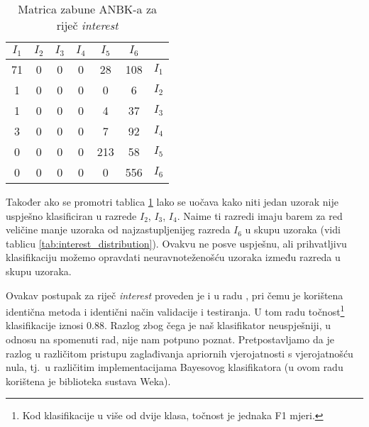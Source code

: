 \documentclass[10pt, a4paper]{article}
\begin{document}
\begin{table}[!hbtp]
\caption{Matrica zabune ANBK-a za riječ \emph{interest}}
\label{tab:interest_confusion_bayes}
\begin{center}
\begin{tabular}{|cccccc|c|}
\hline
$I_1$ & $I_2$ & $I_3$ & $I_4$ & $I_5$ & $I_6$ &  \\
\hline
  71  & 0 &  0 &  0 & 28  & 108 &   $I_1$  \\
   1  & 0 &  0 &  0 &  0  &  6  &   $I_2$  \\
   1  & 0 &  0 &  0 &  4  & 37  &   $I_3$  \\
   3  & 0 &  0 &  0 &  7  & 92  &   $I_4$  \\
   0  & 0 &  0 &  0 & 213 & 58  &   $I_5$  \\
   0  & 0 &  0 &  0 &  0  & 556 &   $I_6$  \\
\hline
\end{tabular}
\end{center}
\end{table}

Također ako se promotri tablica \ref{tab:interest_confusion_bayes} lako se uočava
kako niti jedan uzorak nije uspješno klasificiran u razrede $I_2$, $I_3$, $I_4$.
Naime ti razredi imaju barem za red veličine manje uzoraka od najzastupljenijeg razreda $I_6$
u skupu uzoraka (vidi tablicu \ref{tab:interest_distribution}). Ovakvu ne posve
uspješnu, ali prihvatljivu klasifikaciju možemo opravdati neuravnoteženošću uzoraka
između razreda u skupu uzoraka.

Ovakav postupak za riječ \emph{interest} proveden je i u radu \citep{pedersen}, pri
čemu je korištena identična metoda i identični način validacije i testiranja. 
U tom radu točnost\footnote{Kod klasifikacije u više od dvije klasa, točnost je jednaka F1 mjeri.} klasifikacije iznosi $0.88$. 
Razlog zbog čega je naš klasifikator neuspješniji, u odnosu na spomenuti rad, nije nam 
potpuno poznat. Pretpostavljamo da je razlog u različitom pristupu zaglađivanja
apriornih vjerojatnosti s vjerojatnošću nula, tj.~u različitim
implementacijama Bayesovog klasifikatora (u ovom radu korištena
je biblioteka sustava Weka). 
\end{document}
